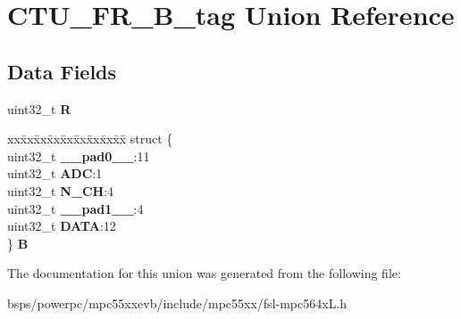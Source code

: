 \hypertarget{unionCTU__FR__32B__tag}{}\section{C\+T\+U\+\_\+\+F\+R\+\_\+B\+\_\+tag Union Reference}
\label{unionCTU__FR__32B__tag}
\subsection*{Data Fields}
\begin{DoxyCompactItemize}
\item 
\mbox{\label{unionCTU__FR__32B__tag_a2057429c67c32bedf8e2576a6b22d2c9}} 
uint32\+\_\+t {\bfseries R}
\item 
\mbox{\label{unionCTU__FR__32B__tag_ab6704d9875f1cb5ce92f6bd72353283b}} 
\begin{tabbing}
xx\=xx\=xx\=xx\=xx\=xx\=xx\=xx\=xx\=\kill
struct \{\\
\>uint32\_t {\bfseries \_\_pad0\_\_}:11\\
\>uint32\_t {\bfseries ADC}:1\\
\>uint32\_t {\bfseries N\_CH}:4\\
\>uint32\_t {\bfseries \_\_pad1\_\_}:4\\
\>uint32\_t {\bfseries DATA}:12\\
\} {\bfseries B}\\

\end{tabbing}\end{DoxyCompactItemize}


The documentation for this union was generated from the following file\+:\begin{DoxyCompactItemize}
\item 
bsps/powerpc/mpc55xxevb/include/mpc55xx/fsl-\/mpc564x\+L.\+h\end{DoxyCompactItemize}

